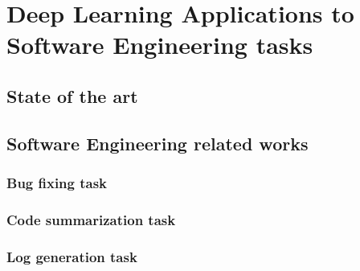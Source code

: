 \chapter{Deep Learning Applications to Software Engineering tasks}

\section{State of the art}
\section{Software Engineering related works}
\subsection{Bug fixing task}
\subsection{Code summarization task}
\subsection{Log generation task}
\section{}